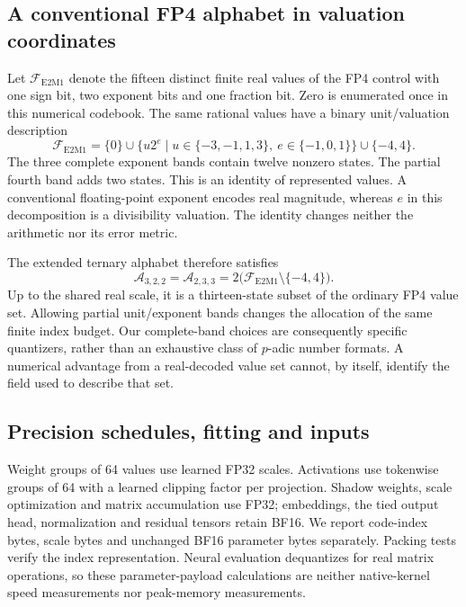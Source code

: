 \documentclass[11pt]{article}
\begin{document}
\subsection{A conventional FP4 alphabet in valuation coordinates}

Let \(\mathcal F_{\mathrm{E2M1}}\) denote the fifteen distinct finite real
values of the FP4 control with one sign bit, two exponent bits and one
fraction bit. Zero is enumerated once in this numerical codebook.
The same rational values have a binary unit/valuation description
\begin{equation}
 \mathcal F_{\mathrm{E2M1}}
 =\{0\}\cup
   \{u2^e\mid u\in\{-3,-1,1,3\},\ e\in\{-1,0,1\}\}
   \cup\{-4,4\}.
\end{equation}
The three complete exponent bands contain twelve nonzero states. The
partial fourth band adds two states. This is an identity of represented
values. A conventional floating-point exponent encodes real magnitude,
whereas \(e\) in this decomposition is a divisibility valuation.
The identity changes neither the arithmetic nor its error metric.

The extended ternary alphabet therefore satisfies
\begin{equation}
 \mathcal A_{3,2,2}
 =\mathcal A_{2,3,3}
 =2\bigl(\mathcal F_{\mathrm{E2M1}}\setminus\{-4,4\}\bigr).
\end{equation}
Up to the shared real scale, it is a thirteen-state subset of the ordinary
FP4 value set. Allowing partial unit/exponent bands changes the allocation
of the same finite index budget. Our complete-band choices are consequently
specific quantizers, rather than an exhaustive class of \(p\)-adic number
formats. A numerical advantage from a real-decoded value set cannot, by
itself, identify the field used to describe that set.

\subsection{Precision schedules, fitting and inputs}

Weight groups of 64 values use learned FP32 scales. Activations use tokenwise
groups of 64 with a learned clipping factor per projection. Shadow weights,
scale optimization and matrix accumulation use FP32; embeddings, the tied
output head, normalization and residual tensors retain BF16. We report
code-index bytes, scale bytes and unchanged BF16 parameter bytes separately.
Packing tests verify the index representation. Neural evaluation dequantizes
for real matrix operations, so these parameter-payload calculations are
neither native-kernel speed measurements nor peak-memory measurements.
\end{document}
